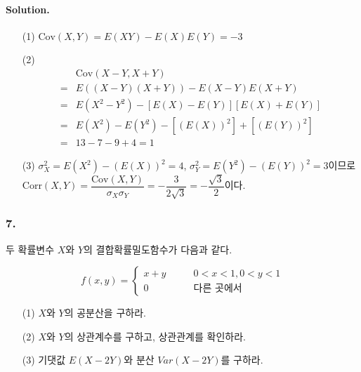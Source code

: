 \paragraph{Solution.} \begin{itemize}
  \item [(1)] $\mathrm{Cov}\left(X, Y\right) = E\left(XY\right) - E\left(X\right)E\left(Y\right) = -3$\\
  \item [(2)]
\begin{align*}
	& \mathrm{Cov}\left(X-Y, X+Y\right) \\
	=& E\left(\left(X-Y\right)\left(X+Y\right)\right) - E\left(X-Y\right)E\left(X+Y\right) \\
	=& E\left(X^2-Y^2\right) - \left[E\left(X\right)-E\left(Y\right)\right]\left[E\left(X\right)+E\left(Y\right)\right] \\
	=& E\left(X^2\right) - E\left(Y^2\right) - \left[\left(E\left(X\right)\right)^2\right] + \left[\left(E\left(Y\right)\right)^2\right]\\
	=& 13-7-9+4=1
\end{align*}
  \item [(3)] $\sigma_X^2 = E\left(X^2\right) - \left(E\left(X\right)\right)^2 = 4$, $\sigma_Y^2 = E\left(Y^2\right) - \left(E\left(Y\right)\right)^2 = 3$이므로 $\mathrm{Corr}\left(X, Y\right) = \dfrac{\mathrm{Cov}\left(X, Y\right)}{\sigma_X \sigma_Y} = -\dfrac{3}{2\sqrt{3}} = -\dfrac{\sqrt{3}}{2}$이다.
\end{itemize}

\subsubsection{7.} 두 확률변수 $X$와 $Y$의 결합확률밀도함수가 다음과 같다.

\[f\left(x, y\right) = \left\{
\begin{array}{ll}
	x+y & \qquad 0<x<1, 0<y<1 \\
	0 & \qquad\textrm{다른 곳에서}
\end{array}
\right. \]

\begin{itemize}
  \item [(1)] $X$와 $Y$의 공분산을 구하라.
  \item [(2)] $X$와 $Y$의 상관계수를 구하고, 상관관계를 확인하라.
  \item [(3)] 기댓값 $E\left(X-2Y\right)$와 분산 $Var\left(X-2Y\right)$를 구하라.
\end{itemize}

